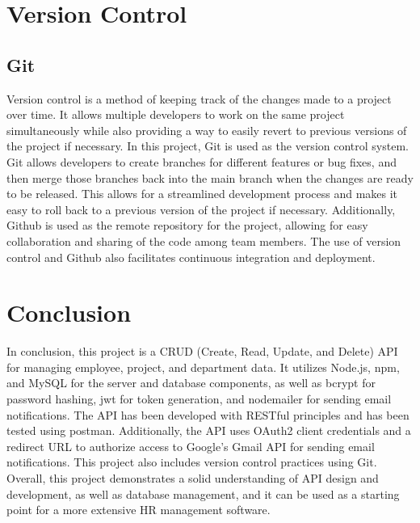 \documentclass[12pt]{article}
\begin{document}
\section*{Version Control}
\subsection*{Git}
Version control is a method of keeping track of the changes made to a project over time. It allows multiple developers to work on the same project simultaneously while also providing a way to easily revert to previous versions of the project if necessary. In this project, Git is used as the version control system. Git allows developers to create branches for different features or bug fixes, and then merge those branches back into the main branch when the changes are ready to be released. This allows for a streamlined development process and makes it easy to roll back to a previous version of the project if necessary. Additionally, Github is used as the remote repository for the project, allowing for easy collaboration and sharing of the code among team members. The use of version control and Github also facilitates continuous integration and deployment.

\section*{Conclusion}
In conclusion, this project is a CRUD (Create, Read, Update, and Delete) API for managing employee, project, and department data. It utilizes Node.js, npm, and MySQL for the server and database components, as well as bcrypt for password hashing, jwt for token generation, and nodemailer for sending email notifications. The API has been developed with RESTful principles and has been tested using postman. Additionally, the API uses OAuth2 client credentials and a redirect URL to authorize access to Google's Gmail API for sending email notifications. This project also includes version control practices using Git. Overall, this project demonstrates a solid understanding of API design and development, as well as database management, and it can be used as a starting point for a more extensive HR management software.
\end{document}
